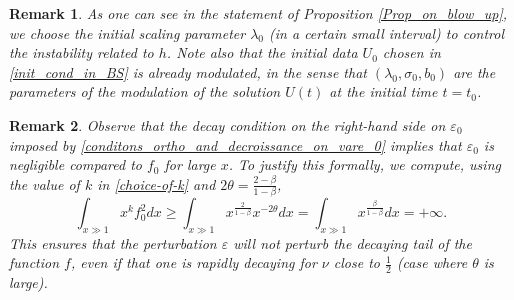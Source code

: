 \documentclass[16pt,english, oneside,reqno]{smfart}
\newcommand{\vare}{{\varepsilon}}
\newtheorem{remark}{Remark}[section]
\begin{document}
\begin{remark}
As one can see in the statement of Proposition \ref{Prop_on_blow_up}, 
we choose the initial scaling parameter $\lambda_0$ (in a certain small interval) to control the instability related to $h$.
Note also that the initial data $U_0$ chosen in \eqref{init_cond_in_BS} is already modulated,
in the sense that $(\lambda_0,\sigma_0,b_0)$ are the parameters of the modulation of the solution $U(t)$ at the initial time $t=t_0$.
\end{remark}
\begin{remark}
Observe that the decay condition on the right-hand side  on
$\vare_0$ imposed by \eqref{conditons_ortho_and_decroissance_on_vare_0}
implies that $\vare_0$ is negligible compared to $f_0$ for large $x$. 
To justify this formally, we compute, using the value of $k$ in \eqref{choice-of-k}
and $2\theta = \frac{2-\beta}{1-\beta}$,
\[
\int_{x\gg1} x^k f_0^2 dx
\geq \int_{x\gg1} x^{\frac 2{1-\beta}} x^{-2\theta} dx
= \int_{x\gg1} x^{\frac\beta{1-\beta}} dx = + \infty.
\]
This ensures that the perturbation $\vare$ will not perturb the decaying tail of the function
$f$, even if that one is rapidly decaying for $\nu$ close to $\frac 12$ (case where $\theta$ is large).
\end{remark}
\end{document}
